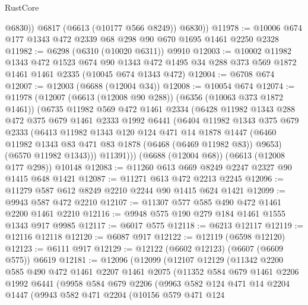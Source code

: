 \begin{lexlean}{RustCore}
\begin{coremodule}
            @6830))
        @6817
        (@6613 (@10177 @566 @8249))
        @6830))
@11978 := @10006 @674 @177 @1343 @472 @2339 @68 @298 @90 @670 @1695 @1461 @2250 @2328
@11982 := @6298 (@6310 (@10020 @6311)) @9910
@12003 := @10002
    @11982
    @1343
    @472
    @1523
    @674
    @90
    @1343
    @472
    @1495
    @34
    @288
    @373
    @569
    @1872
    @1461
    @1461
    @2335
    (@10045 @674 @1343 @472)
@12004 := @6708 @674
@12007 := @12003 (@6688 (@12004 @34))
@12008 := @10054 @674
@12074 := @11978
    (@12007
      (@6613 (@12008 @90 @288))
      (@6356 (@10063 @373 @1872 @1461))
      (@6735
        @11982
        @569
        @472
        @1461
        @2334
        (@6428
          @11982
          @1343
          @288
          @472
          @375
          @679
          @1461
          @2333
          @1992
          @6441
          (@6404
            @11982
            @1343
            @375
            @679
            @2333
            (@6413
              @11982
              @1343
              @120
              @124
              @471
              @14
              @1878
              @1447
              (@6460 @11982 @1343 @83 @471 @83 @1878 (@6468 (@6469 @11982 @83)) @9653)
              (@6570 @11982 @1343)))
          @11391)))
    (@6688 (@12004 @68))
    (@6613 (@12008 @177 @298))
    @10148
@12083 := @11260 @613 @669 @8249 @2247 @2327 @90 @1415 @648 @1421
@12087 := @11271 @613 @472 @2213 @2245
@12096 := @11279 @587 @612 @8249 @2210 @2244 @90 @1415 @624 @1421
@12099 := @9943 @587 @472 @2210
@12107 := @11307 @577 @585 @490 @472 @1461 @2200 @1461 @2210
@12116 := @9948 @575 @190 @279 @184 @1461 @1555 @1343 @917 @9985
@12117 := @6017 @575
@12118 := @6213 @12117
@12119 := @12116 @12118
@12120 := @6087 @917
@12122 := @12119 (@6598 @12120)
@12123 := @6111 @917
@12129 := @12122 (@6602 @12123) (@6607 (@6609 @575)) @6619
@12181 := @12096
    (@12099
      (@12107
        @12129
        (@11342
          @2200
          @585
          @490
          @472
          @1461
          @2207
          @1461
          @2075
          (@11352
            @584
            @679
            @1461
            @2206
            @1992
            @6441
            (@9958
              @584
              @679
              @2206
              (@9963
                @582
                @124
                @471
                @14
                @2204
                @1447
                (@9943
                  @582
                  @471
                  @2204
                  (@10156
                    @579
                    @471
                    @124

\end{coremodule}
\end{lexlean}
